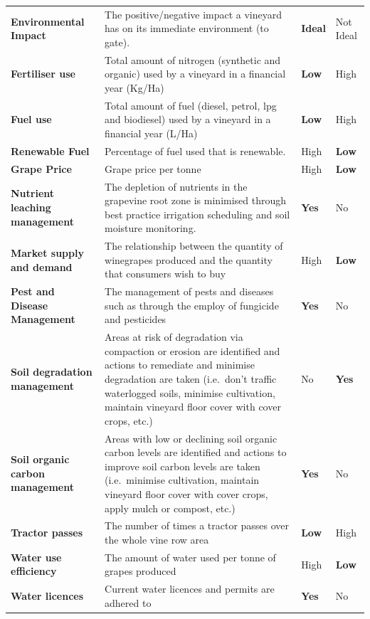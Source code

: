 \documentclass[fleqn,10pt]{wlscirep}
\begin{document}
\begin{table}[h]
\begin{tabular}{@{}llll@{}}
    \textbf{Environmental Impact} & The positive/negative impact a vineyard has on its immediate environment (to gate). & \textbf{Ideal} & Not Ideal \\
    \textbf{Fertiliser use} & Total amount of nitrogen (synthetic and organic) used by a vineyard in a financial year (Kg/Ha) & \textbf{Low} & High \\
    \textbf{Fuel use} & Total amount of fuel (diesel, petrol, lpg and biodiesel) used by a vineyard in a financial year (L/Ha) & \textbf{Low} & High \\
    \textbf{Renewable Fuel} & Percentage of fuel used that is renewable. & High & \textbf{Low} \\
    \textbf{Grape Price} & Grape price per tonne & High & \textbf{Low} \\
    \textbf{Nutrient leaching management} & The depletion of nutrients in the grapevine root zone is minimised through best practice irrigation scheduling and soil moisture monitoring. & \textbf{Yes} & No \\
    \textbf{Market supply and demand} & The relationship between the quantity of winegrapes produced and the quantity that consumers wish to buy & High & \textbf{Low} \\
    \textbf{Pest and Disease Management} & The management of pests and diseases such as through the employ of fungicide and pesticides & \textbf{Yes} & No \\
    \textbf{Soil degradation management} & Areas at risk of degradation via compaction or erosion are identified and actions to remediate and minimise degradation are taken (i.e.~don't traffic waterlogged soils, minimise cultivation, maintain vineyard floor cover with cover crops, etc.) & No & \textbf{Yes} \\
    \textbf{Soil organic carbon management} & Areas with low or declining soil organic carbon levels are identified and actions to improve soil carbon levels are taken (i.e.~minimise cultivation, maintain vineyard floor cover with cover crops, apply mulch or compost, etc.) & \textbf{Yes} & No \\
    \textbf{Tractor passes} & The number of times a tractor passes over the whole vine row area & \textbf{Low} & High \\
    \textbf{Water use efficiency} & The amount of water used per tonne of grapes produced & High & \textbf{Low} \\
    \textbf{Water licences} & Current water licences and permits are adhered to & \textbf{Yes} & No \\

\end{tabular}
\end{table}
\end{document}
